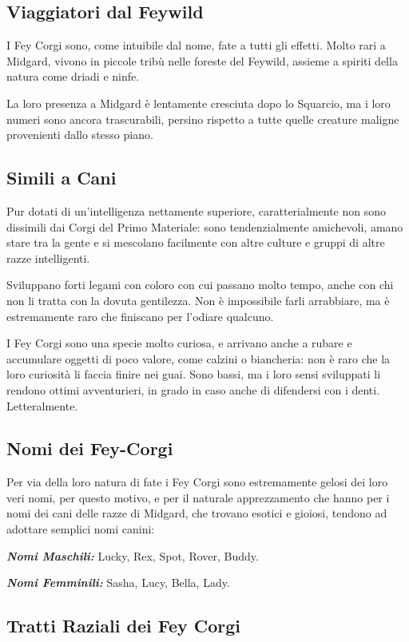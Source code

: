 \subsection{Viaggiatori dal Feywild}
I Fey Corgi sono, come intuibile dal nome, fate a tutti gli effetti. Molto rari a Midgard, vivono in piccole tribù nelle foreste del Feywild, assieme a spiriti della natura come driadi e ninfe.

La loro presenza a Midgard è lentamente cresciuta dopo lo Squarcio, ma i loro numeri sono ancora trascurabili, persino rispetto a tutte quelle creature maligne provenienti dallo stesso piano.

\subsection{Simili a Cani}
Pur dotati di un'intelligenza nettamente superiore, caratterialmente non sono dissimili dai Corgi del Primo Materiale: sono tendenzialmente amichevoli, amano stare tra la gente e si mescolano facilmente con altre culture e gruppi di altre razze intelligenti.

Sviluppano forti legami con coloro con cui passano molto tempo, anche con chi non li tratta con la dovuta gentilezza. Non è impossibile farli arrabbiare, ma è estremamente raro che finiscano per l'odiare qualcuno.

I Fey Corgi sono una specie molto curiosa, e arrivano anche a rubare e accumulare oggetti di poco valore, come calzini o biancheria: non è raro che la loro curiosità li faccia finire nei guai. Sono bassi, ma i loro sensi sviluppati li rendono ottimi avventurieri, in grado in caso anche di difendersi con i denti. Letteralmente.

\subsection{Nomi dei Fey-Corgi}
Per via della loro natura di fate i Fey Corgi sono estremamente gelosi dei loro veri nomi, per questo motivo, e per il naturale apprezzamento che hanno per i nomi dei cani delle razze di Midgard, che trovano esotici e gioiosi, tendono ad adottare semplici nomi canini:

\textit{\textbf{Nomi Maschili:}} Lucky, Rex, Spot, Rover, Buddy.

\textit{\textbf{Nomi Femminili:}} Sasha, Lucy, Bella, Lady.

\subsection{Tratti Raziali dei Fey Corgi}


